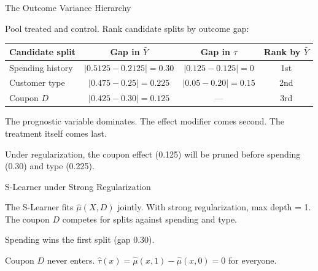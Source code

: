 \documentclass[aspectratio=169, 11pt, handout]{beamer}
\begin{document}
\begin{frame}{The Outcome Variance Hierarchy}
 
Pool treated and control. Rank candidate splits by outcome gap:
 
\bigskip
 
\begin{center}
\begin{tabular}{lccc}
\toprule
\textbf{Candidate split} & \textbf{Gap in $\bar{Y}$} & \textbf{Gap in $\tau$} & \textbf{Rank by $\bar{Y}$} \\
\midrule
Spending history & $|0.5125 - 0.2125| = \mathbf{0.30}$ & $|0.125 - 0.125| = 0$ & 1st \\
Customer type & $|0.475 - 0.25| = 0.225$ & $|0.05 - 0.20| = \mathbf{0.15}$ & 2nd \\
Coupon $D$ & $|0.425 - 0.30| = 0.125$ & --- & 3rd \\
\bottomrule
\end{tabular}
\end{center}
 
\pause
\bigskip
 
The prognostic variable dominates. The effect modifier comes second. The treatment itself comes last.
 
Under regularization, the coupon effect (0.125) will be pruned before spending (0.30) and type (0.225).
 
\end{frame}
 
\begin{frame}{S-Learner under Strong Regularization}
 
The S-Learner fits $\hat{\mu}(X, D)$ jointly. With strong regularization, max depth = 1. The coupon $D$ competes for splits against spending and type.
 
\bigskip
 
\begin{center}
\end{center}
 
\bigskip

Spending wins the first split (gap 0.30).
 
\medskip

\pause 

Coupon $D$ never enters. $\hat{\tau}(x) = \hat{\mu}(x, 1) - \hat{\mu}(x, 0) = 0$ for everyone.
 
\end{frame}
 
\end{document}
